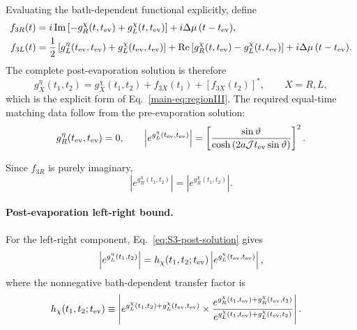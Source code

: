 \documentclass[11pt,a4paper]{article}
\begin{document}
Evaluating the bath-dependent functional explicitly, define
\begin{equation}
\begin{aligned}
f_{3R}(t)
&=
i\operatorname{Im}
\left[
-g^\chi_R(t,t_{\rm ev})
+g^\chi_L(t,t_{\rm ev})
\right]
+i\Delta\mu\,(t-t_{\rm ev}),
\\
f_{3L}(t)
&=\frac{1}{2}
\left[
g^\eta_L(t_{\rm ev},t_{\rm ev})
+
g^\chi_L(t_{\rm ev},t_{\rm ev})
\right]+
\operatorname{Re}
\left[
g^\chi_R(t,t_{\rm ev})
-g^\chi_L(t,t_{\rm ev})
\right]
+i\Delta\mu\,(t-t_{\rm ev}).
\end{aligned}
\label{eq:S3-post-functions}
\end{equation}
The complete post-evaporation solution is therefore
\begin{equation}
g^\eta_X(t_1,t_2)
=
g^\chi_X(t_1,t_2)
+
f_{3X}(t_1)
+
\left[f_{3X}(t_2)\right]^*,
\qquad
X=R,L ,
\label{eq:S3-post-solution}
\end{equation}
which is the explicit form of Eq.~\eqref{main-eq:regionIII}. The required
equal-time matching data follow from the pre-evaporation solution:
\begin{equation}
g^\eta_R(t_{\rm ev},t_{\rm ev})=0,
\qquad
\left|e^{g^\eta_L(t_{\rm ev},t_{\rm ev})}\right|
=
\left[
\frac{\sin\vartheta}{
\cosh\left(
2a\mathcal Jt_{\rm ev}\sin\vartheta
\right)}
\right]^2 .
\label{eq:S3-matching-data}
\end{equation}

Since \(f_{3R}\) is purely imaginary,
\begin{equation}
\left|e^{g^\eta_R(t_1,t_2)}\right|
=
\left|e^{g^\chi_R(t_1,t_2)}\right|.
\label{eq:S3-post-R-magnitude}
\end{equation}

\paragraph*{Post-evaporation left-right bound.}

For the left-right component, Eq.~\eqref{eq:S3-post-solution} gives
\begin{equation}
\left|e^{g^\eta_L(t_1,t_2)}\right|
=
h_\chi(t_1,t_2;t_{\rm ev})
\left|e^{g^\eta_L(t_{\rm ev},t_{\rm ev})}\right|,
\label{eq:S3-post-L-magnitude}
\end{equation}
where the nonnegative bath-dependent transfer factor is
\begin{equation}
\begin{aligned}
h_\chi(t_1,t_2;t_{\rm ev})
&\equiv
\left|
e^{
g^\chi_L(t_1,t_2)
+
g^\chi_L(t_{\rm ev},t_{\rm ev})
}
\times
\frac{e^{
g^\chi_R(t_1,t_{\rm ev})
+
g^\chi_R(t_{\rm ev},t_2)
}
}{
e^{
g^\chi_L(t_1,t_{\rm ev})
+
g^\chi_L(t_{\rm ev},t_2)
}
}
\right| .
\end{aligned}
\label{eq:S3-post-L-ratio}
\end{equation}
\end{document}
